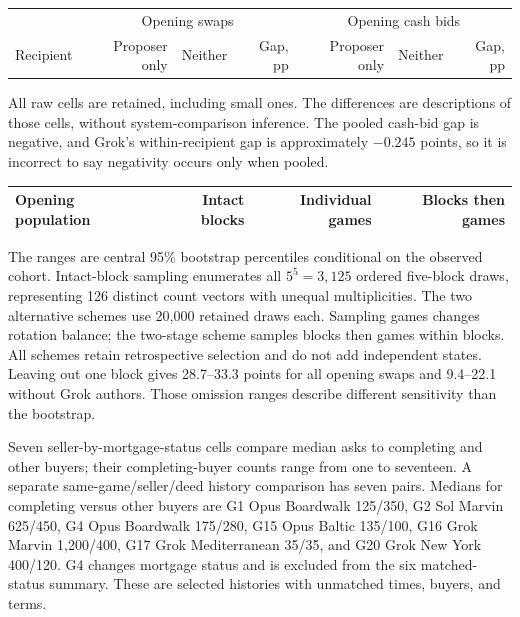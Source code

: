 \begin{center}
\begin{tabular}{@{}lrrrrrr@{}}\toprule
&\multicolumn{3}{c}{Opening swaps}&\multicolumn{3}{c}{Opening cash bids}\\
Recipient & Proposer only & Neither & Gap, pp & Proposer only & Neither & Gap, pp\\\midrule

\end{tabular}
\end{center}
All raw cells are retained, including small ones. The differences are descriptions of those cells, without system-comparison inference. The pooled cash-bid gap is negative, and Grok's within-recipient gap is approximately $-0.245$ points, so it is incorrect to say negativity occurs only when pooled.


\begin{center}
\begin{tabular}{@{}lrrr@{}}\toprule
Opening population & Intact blocks & Individual games & Blocks then games\\\midrule

\end{tabular}
\end{center}
The ranges are central 95\% bootstrap percentiles conditional on the observed cohort. Intact-block sampling enumerates all $5^5=3,125$ ordered five-block draws, representing 126 distinct count vectors with unequal multiplicities. The two alternative schemes use 20,000 retained draws each. Sampling games changes rotation balance; the two-stage scheme samples blocks then games within blocks. All schemes retain retrospective selection and do not add independent states. Leaving out one block gives 28.7--33.3 points for all opening swaps and 9.4--22.1 without Grok authors. Those omission ranges describe different sensitivity than the bootstrap.

Seven seller-by-mortgage-status cells compare median asks to completing and other buyers; their completing-buyer counts range from one to seventeen. A separate same-game/seller/deed history comparison has seven pairs. Medians for completing versus other buyers are G1 Opus Boardwalk 125/350, G2 Sol Marvin 625/450, G4 Opus Boardwalk 175/280, G15 Opus Baltic 135/100, G16 Grok Marvin 1,200/400, G17 Grok Mediterranean 35/35, and G20 Grok New York 400/120. G4 changes mortgage status and is excluded from the six matched-status summary. These are selected histories with unmatched times, buyers, and terms.

